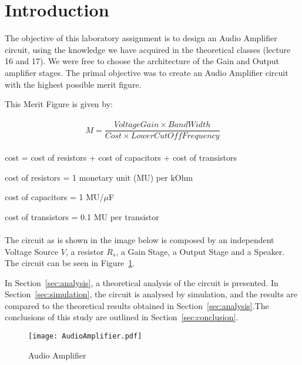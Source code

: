 \section{Introduction}
\label{sec:introduction}

The objective of this laboratory assignment is to design an Audio Amplifier circuit, using the knowledge  we have acquired in the theoretical classes (lecture 16 and 17). We were free to choose the architecture of the Gain and Output amplifier
stages. The primal objective was to create an Audio Amplifier circuit with the highest possible merit figure.


This Merit Figure is given by:
\paragraph{}

\begin{equation}
    M = \frac{VoltageGain \times BandWidth}{Cost \times LowerCutOffFrequency}  
\end{equation}

\paragraph{}

cost = cost of resistors + cost of capacitors + cost of transistors

cost of resistors = 1 monetary unit (MU) per kOhm

cost of capacitors = 1 MU/$\mu$F

cost of transistors = 0.1 MU per transistor

\paragraph{}

The circuit as is shown in the image below is composed by an independent Voltage Source $V$, a resistor $R_s$, a Gain Stage, a Output Stage and a Speaker.
The circuit can be seen in Figure~\ref{fig:audio}.


In Section~\ref{sec:analysis}, a theoretical analysis of the circuit is
presented. In Section~\ref{sec:simulation}, the circuit is analysed by
simulation, and the results are compared to the theoretical results obtained in
Section~\ref{sec:analysis}.The conclusions of this study are outlined in
Section~\ref{sec:conclusion}.

\begin{figure}[h] \centering
\texttt{[image: AudioAmplifier.pdf]}
\caption{Audio Amplifier}
\label{fig:audio}
\end{figure}


